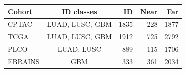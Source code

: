 \begin{tabular}{lcrrr}
\toprule
Cohort & ID classes & ID & Near & Far \\
\midrule
CPTAC & LUAD, LUSC, GBM & 1835 & 228 & 1877 \\
TCGA & LUAD, LUSC, GBM & 1912 & 725 & 2792 \\
PLCO & LUAD, LUSC & 889 & 115 & 1706 \\
EBRAINS & GBM & 333 & 361 & 2034 \\
\bottomrule
\end{tabular}
